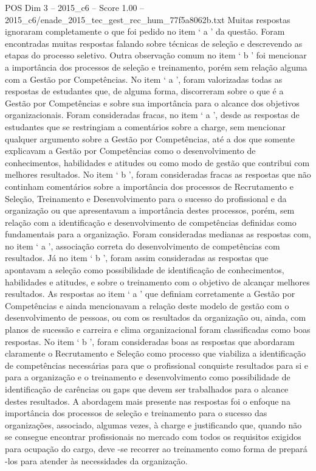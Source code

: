 \begin{textsample}{POS Dim 3 – 2015\_c6 – Score 1.00 – 2015\_c6/enade\_2015\_tec\_gest\_rec\_hum\_77f5a8062b.txt}
Muitas respostas ignoraram completamente o que foi pedido no item ‘ a ’ da questão.
Foram encontradas muitas respostas falando sobre técnicas de seleção e descrevendo as etapas do processo seletivo.
Outra observação comum no item ‘ b ’ foi mencionar a importância dos processos de seleção e treinamento, porém sem relação alguma com a Gestão por Competências.
No item ‘ a ’, foram valorizadas todas as respostas de estudantes que, de alguma forma, discorreram sobre o que é a Gestão por Competências e sobre sua importância para o alcance dos objetivos organizacionais.
Foram consideradas fracas, no item ‘ a ’, desde as respostas de estudantes que se restringiam a comentários sobre a charge, sem mencionar qualquer argumento sobre a Gestão por Competências, até a dos que somente explicavam a Gestão por Competências como o desenvolvimento de conhecimentos, habilidades e atitudes ou como modo de gestão que contribui com melhores resultados.
No item ‘ b ’, foram consideradas fracas as respostas que não continham comentários sobre a importância dos processos de Recrutamento e Seleção, Treinamento e Desenvolvimento para o sucesso do profissional e da organização ou que apresentavam a importância destes processos, porém, sem relação com a identificação e desenvolvimento de competências definidas como fundamentais para a organização.
Foram consideradas medianas as respostas com, no item ‘ a ’, associação correta do desenvolvimento de competências com resultados.
Já no item ‘ b ’, foram assim consideradas as respostas que apontavam a seleção como possibilidade de identificação de conhecimentos, habilidades e atitudes, e sobre o treinamento com o objetivo de alcançar melhores resultados.
As respostas ao item ‘ a ’ que definiam corretamente a Gestão por Competências e ainda mencionavam a relação deste modelo de gestão com o desenvolvimento de pessoas, ou com os resultados da organização ou, ainda, com planos de sucessão e carreira e clima organizacional foram classificadas como boas respostas.
No item ‘ b ’, foram consideradas boas as respostas que abordaram claramente o Recrutamento e Seleção como processo que viabiliza a identificação de competências necessárias para que o profissional conquiste resultados para si e para a organização e o treinamento e desenvolvimento como possibilidade de identificação de carências ou gaps que devem ser trabalhados para o alcance destes resultados.
A abordagem mais presente nas respostas foi o enfoque na importância dos processos de seleção e treinamento para o sucesso das organizações, associado, algumas vezes, à charge e justificando que, quando não se consegue encontrar profissionais no mercado com todos os requisitos exigidos para ocupação do cargo, deve -se recorrer ao treinamento como forma de prepará -los para atender às necessidades da organização.

\end{textsample}
